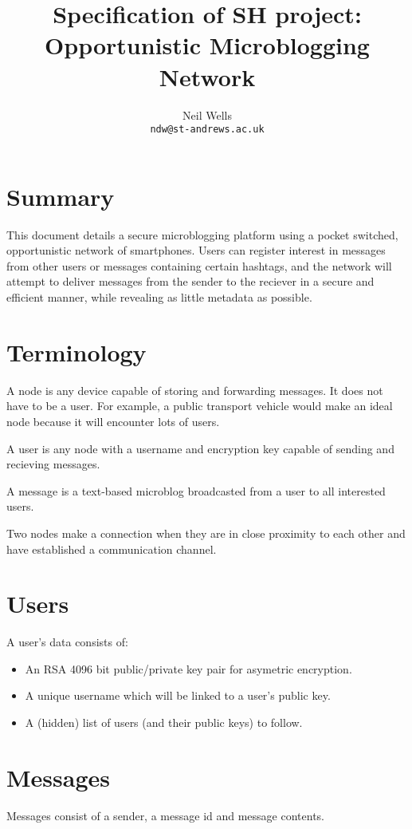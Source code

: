 \documentclass{article}
\title{\textbf{Specification of SH project: Opportunistic Microblogging Network}}
\author{Neil Wells\\
\texttt{ndw@st-andrews.ac.uk}}
\date{}
\begin{document}
\maketitle

\section*{Summary}
This document details a secure microblogging platform using a pocket switched, opportunistic network of smartphones. Users can register interest in messages from other users or messages containing certain hashtags, and the network will attempt to deliver messages from the sender to the reciever in a secure and efficient manner, while revealing as little metadata as possible.


\section*{Terminology}
A node is any device capable of storing and forwarding messages. It does not have to be a user. For example, a public transport vehicle would make an ideal node because it will encounter lots of users.

A user is any node with a username and encryption key capable of sending and recieving messages.

A message is a text-based microblog broadcasted from a user to all interested users.

Two nodes make a connection when they are in close proximity to each other and have established a communication channel.

\section*{Users}
A user's data consists of:
\begin{itemize}
\item An RSA 4096 bit public/private key pair for asymetric encryption.
\item A unique username which will be linked to a user's public key.
\item A (hidden) list of users (and their public keys) to follow.
\end{itemize}

\section*{Messages}
Messages consist of a sender, a message id and message contents.
\end{document}
